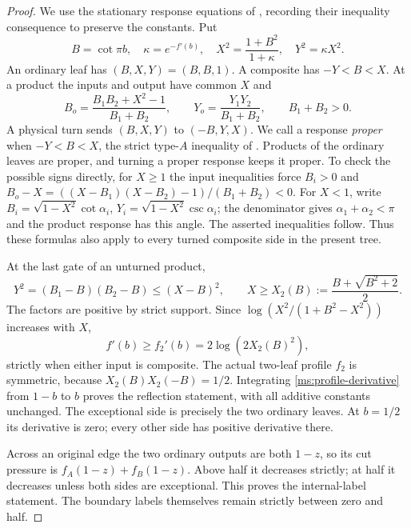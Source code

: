 \begin{proof}
We use the stationary response equations of
\cite[Lemma 7.1 and Proposition 7.2]{Newton}, recording their
inequality consequence to preserve the constants. Put
\[
 B=\cot\pi b,\quad \kappa=e^{-f'(b)},\quad
 X^2=\frac{1+B^2}{1+\kappa},\quad Y^2=\kappa X^2.
\]
An ordinary leaf has $(B,X,Y)=(B,B,1)$. A composite has
$-Y<B<X$. At a product the inputs and output have common $X$ and
\begin{equation}\label{ms:response}
 B_o=\frac{B_1B_2+X^2-1}{B_1+B_2},\qquad
 Y_o=\frac{Y_1Y_2}{B_1+B_2},\qquad B_1+B_2>0.
\end{equation}
A physical turn sends $(B,X,Y)$ to $(-B,Y,X)$. We call a response
\emph{proper} when $-Y<B<X$, the strict type-$A$ inequality of
\cite[Proposition~7.2]{Newton}. Products of the ordinary leaves
are proper, and turning a proper response keeps it proper.
To check the possible signs directly, for $X\ge1$
the input inequalities force $B_i>0$ and
$B_o-X=((X-B_1)(X-B_2)-1)/(B_1+B_2)<0$.
For $X<1$, write $B_i=\sqrt{1-X^2}\cot\alpha_i$,
$Y_i=\sqrt{1-X^2}\csc\alpha_i$; the denominator gives
$\alpha_1+\alpha_2<\pi$ and the product response has this angle.
The asserted inequalities follow. Thus these formulas also apply
to every turned composite side in the present tree.

At the last gate of an unturned product,
\[
 Y^2=(B_1-B)(B_2-B)\le(X-B)^2,
 \qquad X\ge X_2(B):=\frac{B+\sqrt{B^2+2}}2.
\]
The factors are positive by strict support. Since
$\log(X^2/(1+B^2-X^2))$ increases with $X$,
\begin{equation}\label{ms:profile-derivative}
 f'(b)\ge f_2'(b)=2\log(2X_2(B)^2),
\end{equation}
strictly when either input is composite. The actual two-leaf
profile $f_2$ is symmetric, because $X_2(B)X_2(-B)=1/2$.
Integrating \eqref{ms:profile-derivative} from $1-b$ to $b$
proves the reflection statement, with all additive constants
unchanged. The exceptional side is precisely the two ordinary
leaves. At $b=1/2$ its derivative is zero; every other side has
positive derivative there.

Across an original edge the two ordinary outputs are both $1-z$,
so its cut pressure is $f_A(1-z)+f_B(1-z)$. Above half it
decreases strictly; at half it decreases unless both sides are
exceptional. This proves the internal-label statement. The
boundary labels themselves remain strictly between zero and half.


\end{proof}
